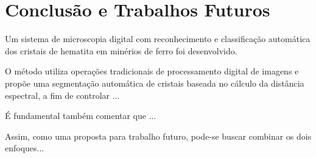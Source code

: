
\chapter{Conclusão e Trabalhos Futuros}

Um sistema de microscopia digital com reconhecimento e classificação
automática dos cristais de hematita em minérios de ferro foi
desenvolvido.

O método utiliza operações tradicionais de processamento digital de
imagens e propõe uma segmentação automática de cristais baseada no
cálculo da distância espectral, a fim de controlar ...

É fundamental também comentar que ...

Assim, como uma proposta para trabalho futuro, pode-se buscar combinar
os dois enfoques...
